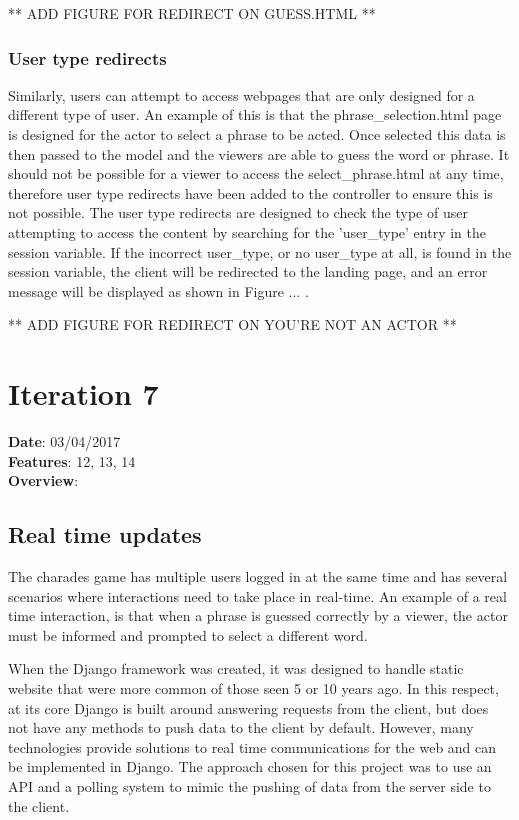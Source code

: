 ** ADD FIGURE FOR REDIRECT ON GUESS.HTML ** 

\subsubsection{User type redirects}
Similarly, users can attempt to access webpages that are only designed for a different type of user. An example of this is that the phrase\_selection.html page is designed for the actor to select a phrase to be acted. Once selected this data is then passed to the model and the viewers are able to guess the word or phrase. It should not be possible for a viewer to access the select\_phrase.html at any time, therefore user type redirects have been added to the controller to ensure this is not possible. The user type redirects are designed to check the type of user attempting to access the content by searching for the 'user\_type' entry in the session variable. If the incorrect user\_type, or no user\_type at all, is found in the session variable, the client will be redirected to the landing page, and an error message will be displayed as shown in Figure ... .

** ADD FIGURE FOR REDIRECT ON YOU'RE NOT AN ACTOR **
\newpage

\section{Iteration 7}
\textbf{Date}: 03/04/2017 \\
\textbf{Features}: 12, 13, 14 \\
\textbf{Overview}:

\subsection{Real time updates}
The charades game has multiple users logged in at the same time and has several scenarios where interactions need to take place in real-time. An example of a real time interaction, is that when a phrase is guessed correctly by a viewer, the actor must be informed and prompted to select a different word.

When the Django framework was created, it was designed to handle static website that were more common of those seen 5 or 10 years ago. In this respect, at its core Django is built around answering requests from the client, but does not have any methods to push data to the client by default. However, many technologies provide solutions to real time communications for the web and can be implemented in Django. The approach chosen for this project was to use an API and a polling system to mimic the pushing of data from the server side to the client. 

